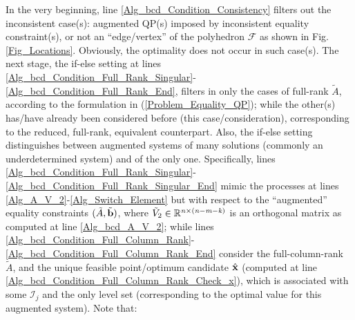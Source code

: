 \documentclass{imaman}
\newcommand{\bfb}{{\bf b}}
\newcommand{\bfx}{{\bf x}}
\newcommand{\real}{\mathbb{R}}
\newcommand{\calF}{{\mathcal F}}
\newcommand{\calI}{{\mathcal I}}
\newcommand{\itk}{{\it k}}
\newcommand{\itm}{{\it m}}
\newcommand{\itn}{{\it n}}
\numberwithin{equation}{section}
\begin{document}
In the very beginning, line \ref{Alg_bcd_Condition_Consistency} filters out the inconsistent case(s): augmented QP(s) imposed by inconsistent equality constraint(s), or not an ``edge/vertex'' of the polyhedron $\calF$ as shown in Fig. \ref{Fig_Locations}. Obviously, the optimality does not occur in such case(s). The next stage, the if-else setting at lines \ref{Alg_bcd_Condition_Full_Rank_Singular}-\ref{Alg_bcd_Condition_Full_Rank_End}, filters in only the cases of full-rank $\tilde A$, according to the formulation in (\ref{Problem_Equality_QP}); while the other(s) has/have already been considered before (this case/consideration), corresponding to the reduced, full-rank, equivalent counterpart. Also, the if-else setting distinguishes between augmented systems of many solutions (commonly an underdetermined system) and of the only one. Specifically, lines \ref{Alg_bcd_Condition_Full_Rank_Singular}-\ref{Alg_bcd_Condition_Full_Rank_Singular_End} mimic the processes at lines \ref{Alg_A_V_2}-\ref{Alg_Switch_Element} but with respect to the ``augmented'' equality constraints $(\tilde A,\tilde\bfb)$, where $\tilde V_2\in\real^{\itn\times(\itn-\itm-\itk)}$ is an orthogonal matrix as computed at line \ref{Alg_bcd_A_V_2}; while lines \ref{Alg_bcd_Condition_Full_Column_Rank}-\ref{Alg_bcd_Condition_Full_Column_Rank_End} consider the full-column-rank $\tilde A$, and the unique feasible point/optimum candidate $\hat\bfx$ (computed at line \ref{Alg_bcd_Condition_Full_Column_Rank_Check_x}), which is associated with some $\calI_j$ and the only level set (corresponding to the optimal value for this augmented system). Note that:
\end{document}
